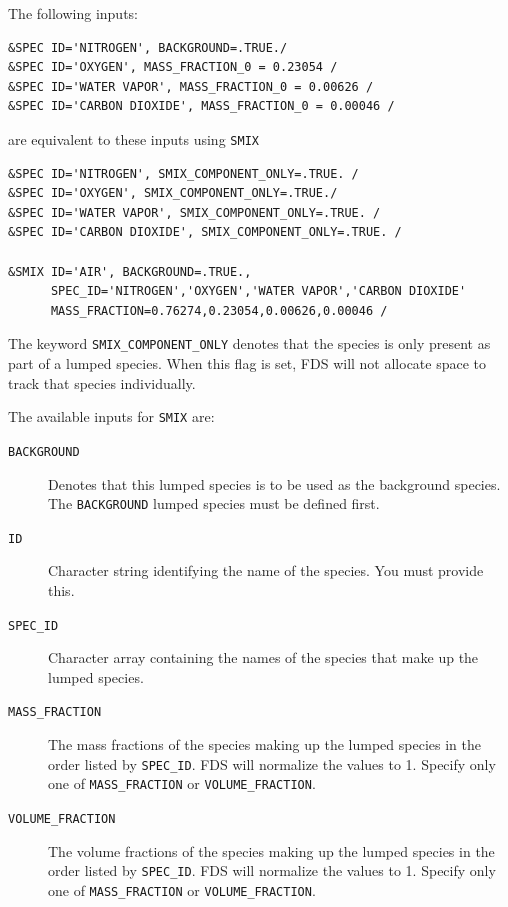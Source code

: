 \documentclass[11pt]{book}
\newcommand{\ct}{\tt\small}
\begin{document}
The following inputs:

\footnotesize
\begin{verbatim}
&SPEC ID='NITROGEN', BACKGROUND=.TRUE./
&SPEC ID='OXYGEN', MASS_FRACTION_0 = 0.23054 /
&SPEC ID='WATER VAPOR', MASS_FRACTION_0 = 0.00626 /
&SPEC ID='CARBON DIOXIDE', MASS_FRACTION_0 = 0.00046 /
\end{verbatim} \normalsize

\noindent
are equivalent to these inputs using {\ct SMIX}

\footnotesize
\begin{verbatim}
&SPEC ID='NITROGEN', SMIX_COMPONENT_ONLY=.TRUE. /
&SPEC ID='OXYGEN', SMIX_COMPONENT_ONLY=.TRUE./
&SPEC ID='WATER VAPOR', SMIX_COMPONENT_ONLY=.TRUE. /
&SPEC ID='CARBON DIOXIDE', SMIX_COMPONENT_ONLY=.TRUE. /

&SMIX ID='AIR', BACKGROUND=.TRUE.,
      SPEC_ID='NITROGEN','OXYGEN','WATER VAPOR','CARBON DIOXIDE'
      MASS_FRACTION=0.76274,0.23054,0.00626,0.00046 /
\end{verbatim} \normalsize

\noindent
The keyword {\ct SMIX\_COMPONENT\_ONLY} denotes that the species is only present as part of a lumped species.
When this flag is set, FDS will not allocate space to track that species individually.

The available inputs for {\ct SMIX} are:

\begin{description}
\item[{\ct BACKGROUND}] Denotes that this lumped species is to be used as the background species.  The {\ct BACKGROUND} lumped species must be defined first.
\item[{\ct ID}] Character string identifying the name of the species. You must provide this.
\item[{\ct SPEC\_ID}] Character array containing the names of the species that make up the lumped species.
\item[{\ct MASS\_FRACTION}] The mass fractions of the species making up the lumped species in the order listed by {\ct SPEC\_ID}.  FDS will normalize the values to 1.
Specify only one of {\ct MASS\_FRACTION} or {\ct VOLUME\_FRACTION}.
\item[{\ct VOLUME\_FRACTION}]  The volume fractions of the species making up the lumped species in the order listed by {\ct SPEC\_ID}.  FDS will normalize the values to 1.
Specify only one of {\ct MASS\_FRACTION} or {\ct VOLUME\_FRACTION}.
\end{description}
\end{document}
